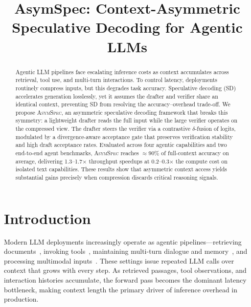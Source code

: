 \documentclass[11pt]{article}
\title{AsymSpec: Context-Asymmetric Speculative Decoding for Agentic LLMs}
\newcommand{\crchange}[1]{#1}
\theoremstyle{plain}
\theoremstyle{definition}
\begin{document}
\maketitle

\begin{abstract}
Agentic LLM pipelines face escalating inference costs as context accumulates across retrieval, tool use, and multi-turn interactions. To control latency, deployments routinely compress inputs, but this degrades task accuracy. Speculative decoding (SD) accelerates generation losslessly, yet it assumes the drafter and verifier share an identical context, preventing SD from resolving the accuracy--overhead trade-off. We propose \textsc{AsymSpec}, an asymmetric speculative decoding framework that breaks this symmetry: a lightweight drafter reads the full input while the large verifier operates on the compressed view. The drafter steers the verifier via a contrastive $\delta$-fusion of logits, modulated by a divergence-aware acceptance gate that preserves verification stability and high draft acceptance rates. Evaluated across four agentic capabilities and two end-to-end agent benchmarks, \textsc{AsymSpec} reaches $\approx$90\% of full-context accuracy on average, delivering 1.3--1.7$\times$ throughput speedups at 0.2--0.3$\times$ the compute cost on isolated text capabilities. These results show that asymmetric context access yields substantial gains precisely when compression discards critical reasoning signals.
\end{abstract}

\section{Introduction}
\label{sec:intro}

Modern LLM deployments increasingly operate as agentic pipelines---retrieving documents~\crchange{\citep{lewis2020rag,gao2023ragsurvey,wu-etal-2025-querycentric}}, invoking tools~\citep{yao2023react,toolformer2023}, maintaining multi-turn dialogue\crchange{ and memory}~\crchange{\citep{sirdeshmukh2025multichallenge,DBLP:journals/corr/abs-2501-09959,wu-etal-2025-memory}}, and processing multimodal inputs~\citep{liu2024llava}. These settings issue repeated LLM calls over context that grows with every step. As retrieved passages, tool observations, and interaction histories accumulate, the forward pass becomes the dominant latency bottleneck, making context length the primary driver of inference overhead in production.
\end{document}
